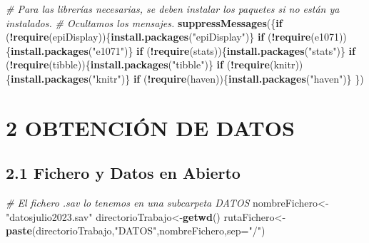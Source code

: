 \documentclass[
]{article}
\newenvironment{Shaded}{\begin{snugshade}}{\end{snugshade}}
\newcommand{\AttributeTok}[1]{\textcolor[rgb]{0.13,0.29,0.53}{#1}}
\newcommand{\CommentTok}[1]{\textcolor[rgb]{0.56,0.35,0.01}{\textit{#1}}}
\newcommand{\ControlFlowTok}[1]{\textcolor[rgb]{0.13,0.29,0.53}{\textbf{#1}}}
\newcommand{\FunctionTok}[1]{\textcolor[rgb]{0.13,0.29,0.53}{\textbf{#1}}}
\newcommand{\NormalTok}[1]{#1}
\newcommand{\OtherTok}[1]{\textcolor[rgb]{0.56,0.35,0.01}{#1}}
\newcommand{\SpecialCharTok}[1]{\textcolor[rgb]{0.81,0.36,0.00}{\textbf{#1}}}
\newcommand{\StringTok}[1]{\textcolor[rgb]{0.31,0.60,0.02}{#1}}
\begin{document}
\begin{Shaded}
\begin{Highlighting}[]
\CommentTok{\# Para las librerías necesarias, se deben instalar los paquetes si no están ya instalados. }
\CommentTok{\# Ocultamos los mensajes.}
\FunctionTok{suppressMessages}\NormalTok{(\{}\ControlFlowTok{if}\NormalTok{ (}\SpecialCharTok{!}\FunctionTok{require}\NormalTok{(epiDisplay))\{}\FunctionTok{install.packages}\NormalTok{(}\StringTok{"epiDisplay"}\NormalTok{)\}}
\ControlFlowTok{if}\NormalTok{ (}\SpecialCharTok{!}\FunctionTok{require}\NormalTok{(e1071))\{}\FunctionTok{install.packages}\NormalTok{(}\StringTok{"e1071"}\NormalTok{)\}}
\ControlFlowTok{if}\NormalTok{ (}\SpecialCharTok{!}\FunctionTok{require}\NormalTok{(stats))\{}\FunctionTok{install.packages}\NormalTok{(}\StringTok{"stats"}\NormalTok{)\}}
\ControlFlowTok{if}\NormalTok{ (}\SpecialCharTok{!}\FunctionTok{require}\NormalTok{(tibble))\{}\FunctionTok{install.packages}\NormalTok{(}\StringTok{"tibble"}\NormalTok{)\}}
\ControlFlowTok{if}\NormalTok{ (}\SpecialCharTok{!}\FunctionTok{require}\NormalTok{(knitr))\{}\FunctionTok{install.packages}\NormalTok{(}\StringTok{"knitr"}\NormalTok{)\}}
\ControlFlowTok{if}\NormalTok{ (}\SpecialCharTok{!}\FunctionTok{require}\NormalTok{(haven))\{}\FunctionTok{install.packages}\NormalTok{(}\StringTok{"haven"}\NormalTok{)\}}
\NormalTok{\})}
\end{Highlighting}
\end{Shaded}

\hypertarget{obtenciuxf3n-de-datos}{%
\section{2 OBTENCIÓN DE DATOS}\label{obtenciuxf3n-de-datos}}

\hypertarget{fichero-y-datos-en-abierto}{%
\subsection{2.1 Fichero y Datos en
Abierto}\label{fichero-y-datos-en-abierto}}

\begin{Shaded}
\begin{Highlighting}[]
\CommentTok{\# El fichero .sav lo tenemos en una subcarpeta DATOS}
\NormalTok{nombreFichero}\OtherTok{\textless{}{-}}\StringTok{"datosjulio2023.sav"}
\NormalTok{directorioTrabajo}\OtherTok{\textless{}{-}}\FunctionTok{getwd}\NormalTok{()}
\NormalTok{rutaFichero}\OtherTok{\textless{}{-}}\FunctionTok{paste}\NormalTok{(directorioTrabajo,}\StringTok{"DATOS"}\NormalTok{,nombreFichero,}\AttributeTok{sep=}\StringTok{"/"}\NormalTok{)}
\end{Highlighting}
\end{Shaded}
\end{document}
